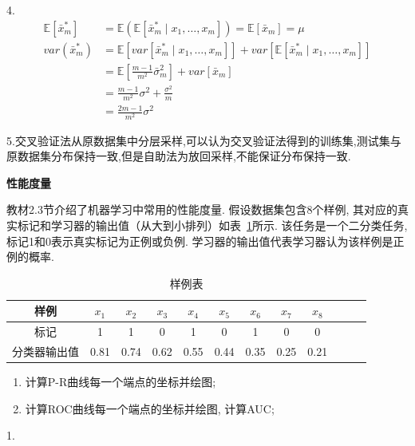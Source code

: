 \documentclass[answers]{exam}  %
\begin{document}
\begin{questions}
\begin{solution}
        4.\begin{align*}
            \mathbb E[\bar{x}_m^*] & =\mathbb E(\mathbb E[\bar{x}^*_m \mid x_1, \ldots, x_m])=\mathbb E[\bar{x}_m]=\mu                    \\
            var(\bar{x}_m^*)       & =\mathbb E[var[\bar{x}^*_m \mid x_1, \ldots, x_m]]+var[\mathbb E[\bar{x}^*_m \mid x_1, \ldots, x_m]] \\&=\mathbb E[\frac{m-1}{m^2} \bar{\sigma}_m^2]+var[\bar{x}_m]\\&=\frac{m-1}{m^2} \sigma^2+\frac{\sigma^2}{m} \\&=\frac{2m-1}{m^2} \sigma^2
        \end{align*}

        5.交叉验证法从原数据集中分层采样,可以认为交叉验证法得到的训练集,测试集与原数据集分布保持一致,但是自助法为放回采样,不能保证分布保持一致.
    \end{solution}


    \question [30] \textbf{性能度量}

    教材2.3节介绍了机器学习中常用的性能度量. 假设数据集包含8个样例, 其对应的真实标记和学习器的输出值（从大到小排列）如表~\ref{table:roc}所示. 该任务是一个二分类任务, 标记1和0表示真实标记为正例或负例.
    学习器的输出值代表学习器认为该样例是正例的概率.
    \begin{table}[!h]
        \centering
        \caption{样例表} \vspace{2mm}\label{table:roc}
        \begin{tabular}{c|c c c c c c c c c c c}\toprule
            样例         & $x_1$ & $x_2$ & $x_3$ & $x_4$ & $x_5$ & $x_{6}$ & $x_{7}$ & $x_{8}$ \\
            \midrule
            标记         & 1     & 1     & 0     & 1     & 0     & 1       & 0       & 0       \\
            \midrule
            分类器输出值 & 0.81  & 0.74  & 0.62  & 0.55  & 0.44  & 0.35    & 0.25    & 0.21    \\
            \bottomrule
        \end{tabular}
    \end{table}
    \begin{enumerate}
        \item 计算P-R曲线每一个端点的坐标并绘图;
        \item 计算ROC曲线每一个端点的坐标并绘图, 计算AUC;
    \end{enumerate}
    \begin{solution}
        1.


\end{solution}
\end{questions}
\end{document}

